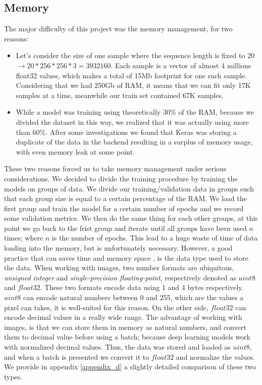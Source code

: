 \documentclass[12pt, a4paper]{report}
\begin{document}
			\subsection{Memory}\label{memory}
				The major difficulty of this project was the memory management, for two reasons:
				\begin{itemize}
					\item Let's consider the size of one sample where the sequence length is fixed to 20 $\rightarrow 20*256*256*3 = 3932160$. Each sample is a vector of almost 4 millions float32 values, which makes a total of 15Mb footprint for one such sample.
					Considering that we had 250Gb of RAM, it means that we can fit only 17K samples at a time, meanwhile our train set contained 67K samples.
					\item While a model was training using theoretically 30\% of the RAM, because we divided the dataset in this way, we realized that it was actually using more than 60\%.
					After some investigations we found that Keras was storing a duplicate of the data in the backend resulting in a surplus of memory usage, with even memory leak at some point.
				\end{itemize}
				These two reasons forced us to take memory management under serious considerations.
				We decided to divide the training procedure by training the models on groups of data.
				We divide our training/validation data in groups such that each group size is equal to a certain percentage of the RAM.
				We load the first group and train the model for a certain number of epochs and we record some validation metrics.
				We then do the same thing for each other groups, at this point we go back to the frist group and iterate until all groups have been used $n$ times; where $n$ is the number of epochs.
				This lead to a huge waste of time of data loading into the memory, but is unfortunately necessary.
				However, a good practice that can saves time and memory space , is the data type used to store the data.
				When working with images, two number formats are ubiquitous, {\itshape unsigned integer} and {\itshape single-precision floating-point}, respectively denoted as $uint8$ and $float32$.
				These two formats encode data using 1 and 4 bytes respectively.
				$uint8$ can encode natural numbers between 0 and 255, which are the values a pixel can takes, it is well-suited for this reason.
				On the other side, $float32$ can encode decimal values in a really wide range.
				The advantage of working with images, is that we can store them in memory as natural numbers, and convert them to decimal value before using a batch; because deep learning models work with normalized decimal values.
				Thus, the data was stored and loaded as $uint8$, and when a batch is presented we convert it to $float32$ and normalize the values.
				We provide in appendix \ref{appendix_d} a slightly detailed comparison of these two types.
\end{document}
